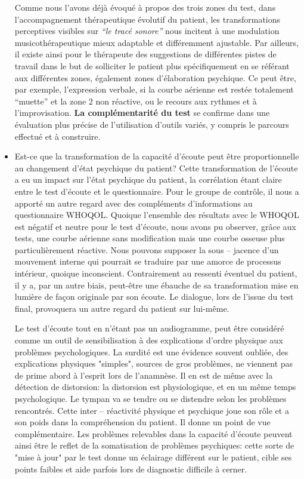 \begin{itemize}
  
 Comme nous l'avons déjà évoqué à propos des trois zones du test, 
 dans l'accompagnement thérapeutique évolutif du patient,
 les transformations perceptives visibles sur
 \textit{``le tracé sonore''} nous incitent à une modulation
 musicothérapeutique mieux adaptable et différemment ajustable.
 Par ailleurs,  il existe ainsi pour le thérapeute des
 suggestions de différentes pistes de travail dans le but de
 solliciter le patient plus spécifiquement en se référant aux
 différentes zones, également zones
 d'élaboration psychique. Ce peut être, par exemple,
 l'expression verbale, si la courbe aérienne est restée
 totalement ``muette'' et la zone 2 non
 réactive, ou le recours aux rythmes et à l'improvisation.
  \textbf{La complémentarité du test} se confirme dans une évaluation plus
 précise de l'utilisation d'outils variés, y compris  le parcours effectué et à
 construire.%
 	\item Est-ce que la transformation de la capacité d'écoute peut être proportionnelle au 
 changement d'état psychique du patient?
   Cette transformation de l'écoute a eu  un impact sur l'état
 psychique du patient, la corrélation étant claire entre le test d'écoute et le questionnaire.
 Pour le groupe de contrôle, il nous a
 apporté un autre regard avec des compléments d'informations au 
 questionnaire
 WHOQOL. Quoique l'ensemble des résultats avec le WHOQOL est
 négatif et neutre pour le
 test d'écoute, nous avons pu observer, grâce aux tests, une 
 courbe 
 aérienne
 sans modification mais une courbe osseuse plus
 particulièrement réactive. 
 Nous pouvons supposer   %
 la sous -- jacence 
 d'un mouvement interne qui pourrait se traduire par 
 une amorce de
 processus intérieur,  quoique inconscient. Contrairement au ressenti éventuel du patient, il y  a, par un 
 autre biais, peut-être une 
 ébauche de sa transformation mise en lumière de façon originale  par son
 écoute. Le dialogue, lors de l'issue du test final,  provoquera un autre 
 regard du patient sur lui-même.
 
 
 Le test d'écoute tout en n'étant pas un audiogramme,  peut  être considéré comme un 
 outil de sensibilisation à des explications 
 d'ordre physique aux problèmes psychologiques. La surdité est une évidence souvent oubliée, des 
 explications physiques "simples", sources de gros problèmes, ne viennent pas de prime abord à l'esprit 
 lors de l'anamnèse. Il en est de même avec la détection de distorsion:
 la distorsion est physiologique, et en un même temps psychologique. Le tympan va se tendre ou se 
 distendre 
 selon les problèmes rencontrés. Cette inter -- réactivité physique et psychique joue son rôle et a son 
 poids dans la compréhension du patient. Il donne un point de vue complémentaire.
  Les problèmes relevables dans la capacité d'écoute peuvent ainsi être  le reflet de la somatisation de 
 problèmes psychiques: 
 cette sorte de  "mise  à jour" par le test donne un éclairage différent sur le patient, cible ses points 
 faibles et aide 
 parfois lors de diagnostic difficile à cerner.
 

\end{itemize}

